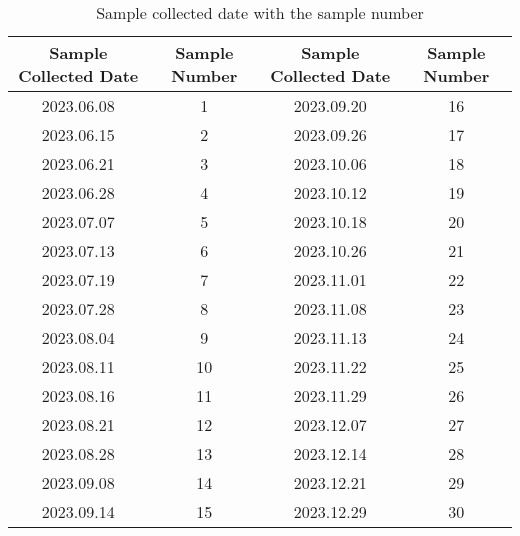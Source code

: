 \begin{table}[H]
    \centering
    \caption{Sample collected date with the sample number}
    \begin{tabular}{|c|c||c|c|}
    \hline
        Sample Collected Date & Sample Number &  Sample Collected Date& Sample Number \\
        \hline
         2023.06.08& 1 & 2023.09.20 & 16\\
         \hline
         2023.06.15& 2  &2023.09.26  & 17\\
         \hline
         2023.06.21& 3 & 2023.10.06 & 18\\
         \hline
         2023.06.28& 4 &2023.10.12  & 19\\
         \hline
         2023.07.07& 5 &2023.10.18  & 20\\
         \hline
         2023.07.13& 6 & 2023.10.26 & 21\\
         \hline
         2023.07.19& 7 &2023.11.01  & 22\\
         \hline
         2023.07.28& 8 & 2023.11.08 & 23\\
         \hline
         2023.08.04& 9 &2023.11.13  & 24\\
         \hline
         2023.08.11& 10 &2023.11.22  & 25\\
         \hline
         2023.08.16& 11 &2023.11.29  & 26\\
         \hline
         2023.08.21& 12 &2023.12.07  & 27\\
         \hline
         2023.08.28& 13 &2023.12.14  & 28\\
         \hline
         2023.09.08& 14 &2023.12.21  & 29\\
         \hline
         2023.09.14& 15 &2023.12.29  & 30\\
         \hline
    \end{tabular}
    \label{table:sample_numbering}
\end{table}